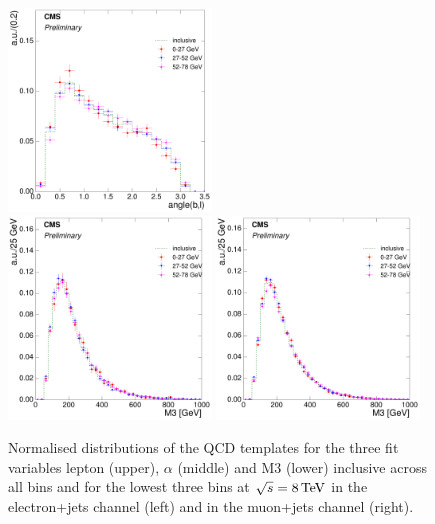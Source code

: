 \begin{figure}[hbtp]
     \includegraphics[width=0.48\textwidth]{Chapters/04_Analysis/04b_XSections/images/8TeV/fit_variables/muon/WPT/angle_bl/qcd/WPT_angle_bl_1orMoreBtag_QCD_template_comparison.pdf}\\
     \includegraphics[width=0.48\textwidth]{Chapters/04_Analysis/04b_XSections/images/8TeV/fit_variables/electron/WPT/M3/qcd/WPT_M3_0orMoreBtag_QCD_template_comparison.pdf}\hfill
     \includegraphics[width=0.48\textwidth]{Chapters/04_Analysis/04b_XSections/images/8TeV/fit_variables/muon/WPT/M3/qcd/WPT_M3_0orMoreBtag_QCD_template_comparison.pdf}\\
	 \caption[Normalised distributions of the QCD templates for the three fit variables in \wpt bins
	 at $\sqrt{s}=8\TeV$.]{Normalised distributions of the QCD templates for the three fit variables lepton
	 \abseta (upper), $\alpha$ (middle) and M3 (lower) inclusive across all \wpt bins and for the lowest three \wpt bins at $\sqrt{s}=8\TeV$ in the electron+jets channel (left) and in the muon+jets channel (right).}
     \label{fig:WPT_fit_variable_qcd_comparisons_8TeV}
\end{figure}

